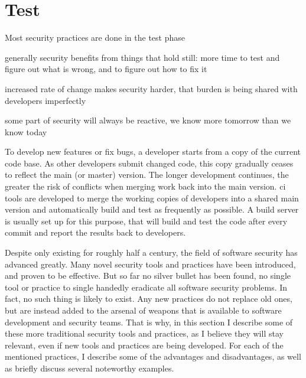 \section{Test}
\label{sec:related-test}

Most security practices are done in the test phase

generally security benefits from things that hold still:
more time to test and figure out what is wrong, and to figure out how to fix it

increased rate of change makes security harder, that burden is being shared with developers imperfectly

some part of security will always be reactive, we know more tomorrow than we know today

To develop new features or fix bugs, a developer starts from a copy of the current code base.
As other developers submit changed code, this copy gradually ceases to reflect the main (or master) version.
The longer development continues, the greater the risk of conflicts when merging work back into the main version.
\Gls{ci} tools are developed to merge the working copies of developers into a shared main version and automatically build and test as frequently as possible.
A build server is usually set up for this purpose, that will build and test the code after every commit and report the results back to developers.


Despite only existing for roughly half a century, the field of software security has advanced greatly.
Many novel security tools and practices have been introduced, and proven to be effective.
But so far no silver bullet has been found, no single tool or practice to single handedly eradicate all software security problems.
In fact, no such thing is likely to exist.
Any new practices do not replace old ones, but are instead added to the arsenal of weapons that is available to software development and security teams.
That is why, in this section I describe some of these more traditional security tools and practices, as I believe they will stay relevant, even if new tools and practices are being developed.
For each of the mentioned practices, I describe some of the advantages and disadvantages, as well as briefly discuss several noteworthy examples.

